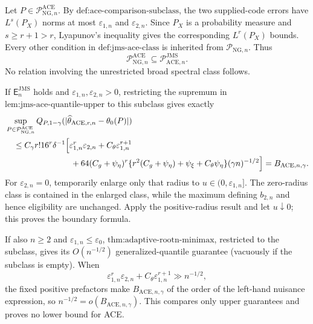 Let \(P\in\mathcal P_{\mathrm{NG},n}^{\mathrm{ACE}}\).  By \(\text{def:ace-comparison-subclass}\), the two supplied-code errors have \(L^s(P_X)\) norms at most \(\varepsilon_{1,n}\) and \(\varepsilon_{2,n}\).  Since \(P_X\) is a probability measure and \(s\ge r+1>r\), Lyapunov's inequality gives the corresponding \(L^r(P_X)\) bounds.  Every other condition in \(\text{def:jms-ace-class}\) is inherited from \(\mathcal P_{\mathrm{NG},n}\).  Thus
\[
 \mathcal P_{\mathrm{NG},n}^{\mathrm{ACE}}\subseteq\mathcal P_{\mathrm{ACE},n}^{\mathrm{JMS}}.
\]
No relation involving the unrestricted broad spectral class follows.

If \(\mathsf E_n^{\mathrm{JMS}}\) holds and \(\varepsilon_{1,n},\varepsilon_{2,n}>0\), restricting the supremum in \(\text{lem:jms-ace-quantile-upper}\) to this subclass gives exactly
\[
\begin{aligned}
 &\sup_{P\in\mathcal P_{\mathrm{NG},n}^{\mathrm{ACE}}}
 Q_{P,1-\gamma}(|\widehat\theta_{\mathrm{ACE},r,n}-\theta_0(P)|)\\
 &\quad\le C_{\gamma}r!16^r\delta^{-1}
 \Big[\varepsilon_{1,n}^r\varepsilon_{2,n}+C_{\theta}\varepsilon_{1,n}^{r+1}\\
 &\hspace{28mm}+64(C_g+\psi_{\eta})^r
 \{r^2(C_g+\psi_{\eta})+\psi_{\xi}+C_{\theta}\psi_{\eta}\}(\gamma n)^{-1/2}\Big]
 =B_{\mathrm{ACE},n,\gamma}.
\end{aligned}
\]
For \(\varepsilon_{2,n}=0\), temporarily enlarge only that radius to \(u\in(0,\varepsilon_{1,n}]\).  The zero-radius class is contained in the enlarged class, while the maximum defining \(b_{2,n}\) and hence eligibility are unchanged.  Apply the positive-radius result and let \(u\downarrow0\); this proves the boundary formula.

If also \(n\ge2\) and \(\varepsilon_{1,n}\le\varepsilon_0\), \(\text{thm:adaptive-rootn-minimax}\), restricted to the subclass, gives its \(O(n^{-1/2})\) generalized-quantile guarantee (vacuously if the subclass is empty).  When
\[
 \varepsilon_{1,n}^r\varepsilon_{2,n}+C_{\theta}\varepsilon_{1,n}^{r+1}\gg n^{-1/2},
\]
the fixed positive prefactors make \(B_{\mathrm{ACE},n,\gamma}\) of the order of the left-hand nuisance expression, so \(n^{-1/2}=o(B_{\mathrm{ACE},n,\gamma})\).  This compares only upper guarantees and proves no lower bound for ACE.